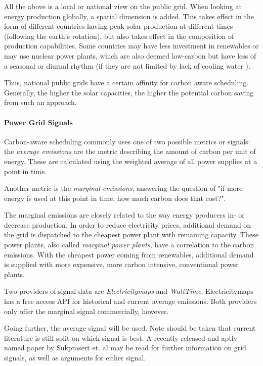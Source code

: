 All the above is a local or national view on the public grid. 
When looking at energy production globally, a spatial dimension is added. 
This takes effect in the form of different countries having peak solar production at different times (following the earth's rotation), but also takes effect in the composition of production capabilities.
Some countries may have less investment in renewables or may use nuclear power plants, which are also deemed low-carbon but have less of a seasonal or diurnal rhythm (if they are not limited by lack of cooling water ).

Thus, national public grids have a certain affinity for carbon aware scheduling\cite{wiesner_lets_2021}. Generally, the higher the solar capacities, the higher the potential carbon saving from such an approach. 

\paragraph{Power Grid Signals}
Carbon-aware scheduling commonly uses one of two possible metrics or signals: the \emph{average emissions} are the metric describing the amount of carbon per unit of energy. These are calculated using the weighted average of all power supplies at a point in time.

Another metric is the \emph{marginal emissions}, answering the question of "if more energy is used at this point in time, how much carbon does that cost?".

The marginal emissions are closely related to the way energy producers in- or decrease production.
In order to reduce electricity prices, additional demand on the grid is dispatched to the cheapest power plant with remaining capacity. 
These power plants, also called \emph{marginal power plants}, have a correlation to the carbon emissions.
With the cheapest power coming from renewables, additional demand is supplied with more expensive, more carbon intensive, conventional power plants.

Two providers of signal data are \emph{Electricitymaps} and \emph{WattTime}.
Electricitymaps has a free access API for historical and current average emissions. Both providers only offer the marginal signal commercially, however. 

Going further, the average signal will be used. 
Note should be taken that current literature is still split on which signal is best. 
A recently released and aptly named paper by Sukprasert et. al \cite{sukprasert_limitations_2024} may be read for further information on grid signals, as well as arguments for either signal.

